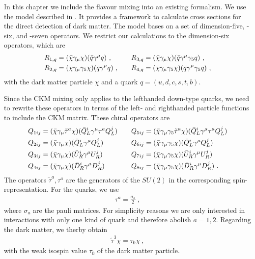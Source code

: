 In this chapter we include the flavour mixing into an existing formalism. We use the model described in \cite{ChiralEFT}. It provides a framework to calculate cross sections for the direct detection of dark matter. The model bases on a set of dimension-five, -six, and -seven operators. We restrict our calculations to the dimension-six operators, which are
\begin{align}\label{eq:normal}
	R_{1,q} &= (\bar{\chi}\gamma_\mu\chi)(\bar{q}\gamma^\mu q) \ , && &R_{3,q} &= (\bar{\chi}\gamma_\mu\chi)(\bar{q}\gamma^\mu\gamma_5q) \ , \notag \\
	R_{2,q} &= (\bar{\chi}\gamma_\mu\gamma_5\chi)(\bar{q}\gamma^\mu q) \ , &&	&R_{4,q} &= (\bar{\chi}\gamma_\mu\gamma_5\chi)(\bar{q}\gamma^\mu\gamma_5q) \ ,
\end{align}
with the dark matter particle $\chi$ and a quark $q=(u,d,c,s,t,b)$.


Since the CKM mixing only applies to the lefthanded down-type quarks, we need to rewrite these operators in terms of the left- and righthanded particle functions to include the CKM matrix. These chiral operators are
\begin{align}\label{eq:chiral}
	Q_{1ij} &= (\bar{\chi}\gamma_\mu\tilde{\tau}^a\chi)(\bar{Q}_L^i\gamma^\mu \tau^aQ_L^j) && &Q_{5ij} &= (\bar{\chi}\gamma_\mu\gamma_5\tilde{\tau}^a\chi)(\bar{Q}_L^i\gamma^\mu \tau^aQ_L^j)\notag \\
	Q_{2ij} &= (\bar{\chi}\gamma_\mu\chi)(\bar{Q}_L^i\gamma^\mu Q_L^j) && &Q_{6ij} &= (\bar{\chi}\gamma_\mu\gamma_5\chi)(\bar{Q}_L^i\gamma^\mu Q_L^j)\notag \\
	Q_{3ij} &= (\bar{\chi}\gamma_\mu\chi)(\bar{U}_R^i\gamma^\mu U_R^j) && &Q_{7ij} &= (\bar{\chi}\gamma_\mu\gamma_5\chi)(\bar{U}_R^i\gamma^\mu U_R^j)\notag \\
	Q_{4ij} &= (\bar{\chi}\gamma_\mu\chi)(\bar{D}_R^i\gamma^\mu D_R^j) && &Q_{8ij} &= (\bar{\chi}\gamma_\mu\gamma_5\chi)(\bar{D}_R^i\gamma^\mu D_R^j) \ .
\end{align}
The operators $\tilde{\tau}^a,\tau^a$ are the generators of the $SU(2)$ in the corresponding spin-representation. For the quarks, we use
\begin{align}
	\tau^a = \frac{\sigma_a}{2} \ ,
\end{align}
where $\sigma_a$ are the pauli matrices. For simplicity reasons we are only interested in interactions with only one kind of quark and therefore abolish $a=1,2$. Regarding the dark matter, we therby obtain
\begin{align}
	\tilde{\tau}^3\chi = \tau_0\chi \ ,
\end{align}
with the weak isospin value $\tau_0$ of the dark matter particle.

